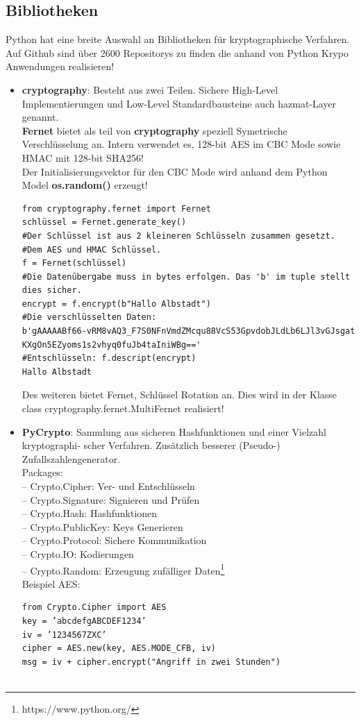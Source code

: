 \documentclass[a4paper,12pt]{scrartcl}
\begin{document}
\subsection{Bibliotheken}
Python hat eine breite Auswahl an Bibliotheken für kryptographische Verfahren. Auf Github sind über 2600 Repositorys zu finden die anhand von Python Krypo Anwendungen realisieren! 
\begin{itemize}
 \item \textbf{cryptography}: Besteht aus zwei Teilen. Sichere High-Level Implementierungen und
Low-Level Standardbausteine auch hazmat-Layer genannt.\\
\textbf{Fernet} bietet als teil von \textbf{cryptography} speziell Symetrische Verschlüsselung an. Intern verwendet es, 128-bit AES im CBC Mode sowie HMAC mit 128-bit SHA256!\\
Der Initialisierungsvektor für den CBC Mode wird anhand dem Python Model \textbf{os.random()} erzeugt!
\begin{verbatim}
from cryptography.fernet import Fernet
schlüssel = Fernet.generate_key() 
#Der Schlüssel ist aus 2 kleineren Schlüsseln zusammen gesetzt. 
#Dem AES und HMAC Schlüssel.
f = Fernet(schlüssel)
#Die Datenübergabe muss in bytes erfolgen. Das 'b' im tuple stellt dies sicher.
encrypt = f.encrypt(b"Hallo Albstadt")
#Die verschlüsselten Daten:
b'gAAAAABf66-vRM8vAQ3_F7S0NFnVmdZMcqu88VcS53GpvdobJLdLb6LJl3vGJsgat
KXgOn5EZyoms1s2vhyq0fuJb4taIniWBg=='
#Entschlüsseln: f.descript(encrypt)
Hallo Albstadt
\end{verbatim}
Des weiteren bietet Fernet, Schlüssel Rotation an. Dies wird in der Klasse \\
class cryptography.fernet.MultiFernet realisiert!
\item \textbf{PyCrypto}: Sammlung aus sicheren Hashfunktionen und einer Vielzahl kryptographi-
scher Verfahren. Zusätzlich besserer (Pseudo-) Zufallszahlengenerator. 
\\Packages:\\
– Crypto.Cipher: Ver- und Entschlüsseln\\
– Crypto.Signature: Signieren und Prüfen\\
– Crypto.Hash: Hashfunktionen\\
– Crypto.PublicKey: Keys Generieren\\
– Crypto.Protocol: Sichere Kommunikation\\
– Crypto.IO: Kodierungen\\
– Crypto.Random: Erzeugung zufälliger Daten\footnote{https://www.python.org/}\\
\newpage
Beispiel AES:
\begin{verbatim}
from Crypto.Cipher import AES
key = ’abcdefgABCDEF1234’
iv = ’1234567ZXC’
cipher = AES.new(key, AES.MODE_CFB, iv)
msg = iv + cipher.encrypt("Angriff in zwei Stunden")


\end{verbatim}
\end{itemize}
\end{document}
